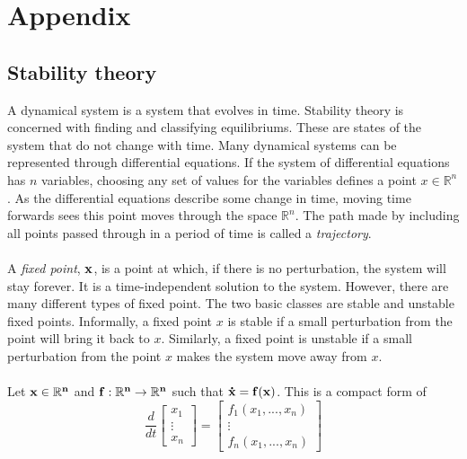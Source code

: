 \chapter{Appendix}\label{ch:mathematical-background}
\section{Stability theory}\label{dynamical-systems}
A dynamical system is a system that evolves in time. Stability theory is concerned with finding and classifying equilibriums. These are states of the system that do not change with time. Many dynamical systems can be represented through differential equations. If the system of differential equations has $n$ variables, choosing any set of values for the variables defines a point $x\in\mathbb{R}^n$. As the differential equations describe some change in time, moving time forwards sees this point moves through the space $\mathbb{R}^n$. The path made by including all points passed through in a period of time is called a \textit{trajectory}.\\
\\
A \textit{fixed point}, $\bf{x}$, is a point at which, if there is no perturbation, the system will stay forever. It is a time-independent solution to the system. However, there are many different types of fixed point. The two basic classes are stable and unstable fixed points. Informally, a fixed point $x$ is stable if a small perturbation from the point will bring it back to $x$. Similarly, a fixed point is unstable if a small perturbation from the point $x$ makes the system move away from $x$.\\
\\
Let $\bf{x}\in\mathbb{R}^n$ and $\bf{f}:\mathbb{R}^n\rightarrow\mathbb{R}^n$ such that $\bf{\dot x}=\bf{f}(\bf{x})$. This is a compact form of
\begin{equation}\label{eq:compact-form}
\frac{d}{dt}
\begin{bmatrix}
 x_1 \\
\vdots\\
x_n
\end{bmatrix}
=
\begin{bmatrix}
f_1(x_1,...,x_n) \\
\vdots\\
f_n(x_1,...,x_n)
\end{bmatrix}
\end{equation}
